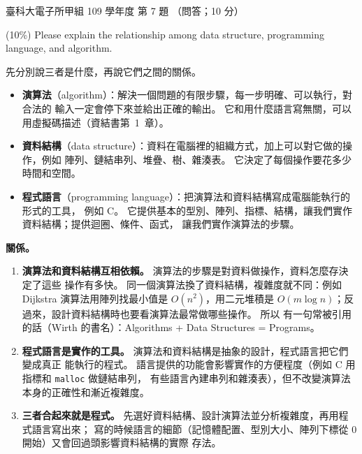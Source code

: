 \begin{pastexam}[label={px:ntust-109-et-ds-07}]{臺科大電子所甲組 109 學年度 第 7 題}
（問答；10 分）

(10\%) Please explain the relationship among data structure, programming language, and algorithm.
\end{pastexam}

\begin{pastsoln}
先分別說三者是什麼，再說它們之間的關係。
\begin{itemize}
\item \textbf{演算法}（algorithm）：解決一個問題的有限步驟，每一步明確、可以執行，對合法的
輸入一定會停下來並給出正確的輸出。 它和用什麼語言寫無關，可以用虛擬碼描述（資結書第~1~章）。
\item \textbf{資料結構}（data structure）：資料在電腦裡的組織方式，加上可以對它做的操作，例如
陣列、鏈結串列、堆疊、樹、雜湊表。 它決定了每個操作要花多少時間和空間。
\item \textbf{程式語言}（programming language）：把演算法和資料結構寫成電腦能執行的形式的工具，
例如 C。 它提供基本的型別、陣列、指標、結構，讓我們實作資料結構；提供迴圈、條件、函式，
讓我們實作演算法的步驟。
\end{itemize}

\textbf{關係。}
\begin{enumerate}
\item \textbf{演算法和資料結構互相依賴。} 演算法的步驟是對資料做操作，資料怎麼存決定了這些
操作有多快。 同一個演算法換了資料結構，複雜度就不同：例如 Dijkstra 演算法用陣列找最小值是
$O(n^2)$，用二元堆積是 $O(m\log n)$；反過來，設計資料結構時也要看演算法最常做哪些操作。 所以
有一句常被引用的話（Wirth 的書名）：Algorithms + Data Structures = Programs。
\item \textbf{程式語言是實作的工具。} 演算法和資料結構是抽象的設計，程式語言把它們變成真正
能執行的程式。 語言提供的功能會影響實作的方便程度（例如 C 用指標和 \texttt{malloc} 做鏈結串列，
有些語言內建串列和雜湊表），但不改變演算法本身的正確性和漸近複雜度。
\item \textbf{三者合起來就是程式。} 先選好資料結構、設計演算法並分析複雜度，再用程式語言寫出來；
寫的時候語言的細節（記憶體配置、型別大小、陣列下標從 $0$ 開始）又會回過頭影響資料結構的實際
存法。
\end{enumerate}
\end{pastsoln}
